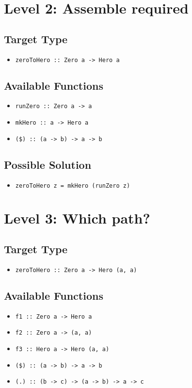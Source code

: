\section{Level 2: Assemble required}

\subsection{Target Type} 
\begin{itemize}
    \item \texttt{zeroToHero :: Zero a -> Hero a}
\end{itemize}

\subsection{Available Functions} 
\begin{itemize}
    \item \texttt{runZero :: Zero a -> a}
    \item \texttt{mkHero :: a -> Hero a}
    \item \texttt{(\$) :: (a -> b) -> a -> b}
\end{itemize}

\subsection{Possible Solution} 
\begin{itemize}
    \item \texttt{zeroToHero z = mkHero (runZero z)}
\end{itemize}

\section{Level 3: Which path?}
\subsection{Target Type } 
\begin{itemize}
    \item \texttt{zeroToHero :: Zero a -> Hero (a, a)}
\end{itemize}

\subsection{Available Functions} 
\begin{itemize}
    \item \texttt{f1 :: Zero a -> Hero a}
    \item \texttt{f2 :: Zero a -> (a, a)}
    \item \texttt{f3 :: Hero a -> Hero (a, a)}
    \item \texttt{(\$) :: (a -> b) -> a -> b}
    \item \texttt{(.) :: (b -> c) -> (a -> b) -> a -> c}
\end{itemize}

